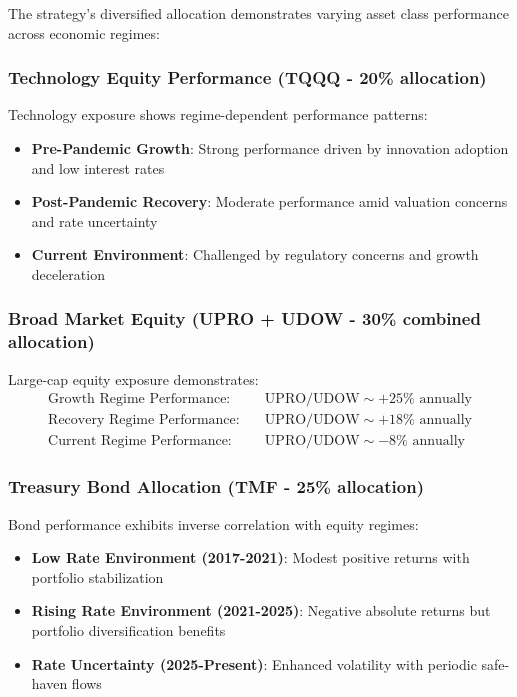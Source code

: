 \documentclass[onecolumn,11pt]{IEEEtran}
\begin{document}
The strategy's diversified allocation demonstrates varying asset class performance across economic regimes:

\subsubsection{Technology Equity Performance (TQQQ - 20\% allocation)}

Technology exposure shows regime-dependent performance patterns:
\begin{itemize}
    \item \textbf{Pre-Pandemic Growth}: Strong performance driven by innovation adoption and low interest rates
    \item \textbf{Post-Pandemic Recovery}: Moderate performance amid valuation concerns and rate uncertainty
    \item \textbf{Current Environment}: Challenged by regulatory concerns and growth deceleration
\end{itemize}

\subsubsection{Broad Market Equity (UPRO + UDOW - 30\% combined allocation)}

Large-cap equity exposure demonstrates:
\begin{align}
\text{Growth Regime Performance:} &\quad \text{UPRO/UDOW} \sim +25\% \text{ annually} \\
\text{Recovery Regime Performance:} &\quad \text{UPRO/UDOW} \sim +18\% \text{ annually} \\
\text{Current Regime Performance:} &\quad \text{UPRO/UDOW} \sim -8\% \text{ annually}
\end{align}

\subsubsection{Treasury Bond Allocation (TMF - 25\% allocation)}

Bond performance exhibits inverse correlation with equity regimes:
\begin{itemize}
    \item \textbf{Low Rate Environment (2017-2021)}: Modest positive returns with portfolio stabilization
    \item \textbf{Rising Rate Environment (2021-2025)}: Negative absolute returns but portfolio diversification benefits
    \item \textbf{Rate Uncertainty (2025-Present)}: Enhanced volatility with periodic safe-haven flows
\end{itemize}
\end{document}
